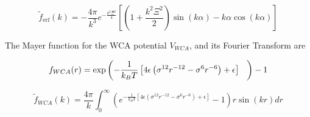 \documentclass[double,12pt]{beavtex}
\begin{document}
\begin{equation}\widetilde{f}_{\operatorname{erf}}(k)=-\frac{4\pi}{k^3}e^{-\frac{k^2\Xi^2}{4}}\left[\left(1+\frac{k^2\Xi^2}{2}\right)\sin(k\alpha)-k\alpha\cos(k\alpha)\right]\end{equation} 

The Mayer function for the WCA potential $V_{WCA}$, and its Fourier Transform are


\begin{equation}f_{WCA}(r)=\operatorname{exp}\left(-\frac{1}{k_BT}\left[4\epsilon\left(\sigma^{12}r^{-12}-\sigma^{6}r^{-6}\right)+\epsilon\right]\color{white}\frac{1}{1}\color{black}\right)-1\end{equation} 

\begin{equation}\widetilde{f}_{WCA}(k)=\frac{4\pi}{k}\int_0^{\infty}{\left(e^{-\frac{1}{k_BT}\left[4\epsilon\left(\sigma^{12}r^{-12}-\sigma^{6}r^{-6}\right)+\epsilon\right]}-1\right) r\sin(kr)dr}\end{equation} 

\end{document}

